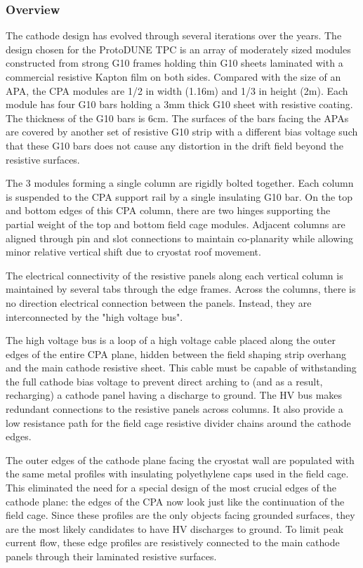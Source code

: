 \subsubsection{Overview}

The cathode design has evolved through several iterations over the years.  The design chosen for the ProtoDUNE TPC is an array of moderately sized modules constructed from strong G10 frames holding thin G10 sheets laminated with a commercial resistive Kapton film on both sides.   Compared with the size of an APA, the CPA modules are 1/2 in width (1.16m) and 1/3 in height (2m).   Each module has four G10 bars holding a 3mm thick G10 sheet with resistive coating.  The thickness of the G10 bars is 6cm.  The surfaces of the bars facing the APAs are covered by another set of resistive G10 strip with a different bias voltage such that these G10 bars does not cause any distortion in the drift field beyond the resistive surfaces.

The 3 modules forming a single column are rigidly bolted together.  Each column is suspended to the CPA support rail by a single insulating G10 bar.  On the top and bottom edges of this CPA column, there are two hinges supporting the partial weight of the top and bottom field cage modules.   Adjacent columns are aligned through pin and slot connections to maintain co-planarity while allowing minor relative vertical shift due to cryostat roof movement.

The electrical connectivity of the resistive panels along each vertical column is maintained by several tabs through the edge frames.  Across the columns, there is no direction electrical connection between the panels.  Instead, they are interconnected by the "high voltage bus". 

The high voltage bus is a loop of a high voltage cable placed along the outer edges of the entire CPA plane, hidden between the field shaping strip overhang and the main cathode resistive sheet.  This cable must be capable of withstanding the full cathode bias voltage to prevent direct arching to (and as a result, recharging) a cathode panel having a discharge to ground. The HV bus makes redundant connections to the resistive panels across columns.  It also provide a low resistance path for the field cage resistive divider chains around the cathode edges.

The outer edges of the cathode plane facing the cryostat wall are populated with the same metal profiles with insulating polyethylene caps used in the field cage.  This eliminated the need for a special design of the most crucial edges of the cathode plane: the edges of the CPA now look just like the continuation of the field cage.  Since these profiles are the only objects facing grounded surfaces, they are the most likely candidates to have HV discharges to ground.   To limit peak current flow, these edge profiles are resistively connected to the main cathode panels through their laminated resistive surfaces.  


